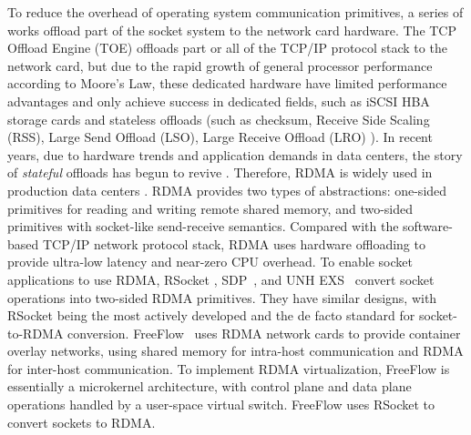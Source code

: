 To reduce the overhead of operating system communication primitives, a series of works offload part of the socket system to the network card hardware. The TCP Offload Engine (TOE) \cite{tcp-chimney-offload} offloads part or all of the TCP/IP protocol stack to the network card, but due to the rapid growth of general processor performance according to Moore's Law, these dedicated hardware have limited performance advantages and only achieve success in dedicated fields, such as iSCSI HBA storage cards \cite{iscsi-hba} and stateless offloads (such as checksum, Receive Side Scaling (RSS), Large Send Offload (LSO), Large Receive Offload (LRO) \cite{lsolro}). In recent years, due to hardware trends and application demands in data centers, the story of \emph{stateful} offloads has begun to revive \cite{chuanxiong-rdma-keynote}. Therefore, RDMA \cite{infiniband2000infiniband} is widely used in production data centers \cite{guo2016rdma}. RDMA provides two types of abstractions: one-sided primitives for reading and writing remote shared memory, and two-sided primitives with socket-like send-receive semantics. Compared with the software-based TCP/IP network protocol stack, RDMA uses hardware offloading to provide ultra-low latency and near-zero CPU overhead. To enable socket applications to use RDMA, RSocket \cite{rsockets}, SDP~\cite{socketsdirect}, and UNH EXS~\cite{russell2008extended} convert socket operations into two-sided RDMA primitives. They have similar designs, with RSocket being the most actively developed and the de facto standard for socket-to-RDMA conversion. FreeFlow~\cite{nsdi19freeflow} uses RDMA network cards to provide container overlay networks, using shared memory for intra-host communication and RDMA for inter-host communication. To implement RDMA virtualization, FreeFlow is essentially a microkernel architecture, with control plane and data plane operations handled by a user-space virtual switch. FreeFlow uses RSocket to convert sockets to RDMA.

